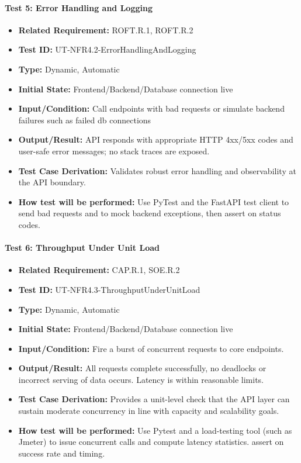 \documentclass[12pt, titlepage]{article}
\begin{document}
\begin{flushleft}
\paragraph{Test 5: Error Handling and Logging}
\begin{itemize}
    \item \textbf{Related Requirement:} ROFT.R.1, ROFT.R.2
    \item \textbf{Test ID:} UT-NFR4.2-ErrorHandlingAndLogging
    \item \textbf{Type:} Dynamic, Automatic
    \item \textbf{Initial State:} Frontend/Backend/Database connection live
    \item \textbf{Input/Condition:} Call endpoints with bad requests or simulate backend failures such as failed db connections
    \item \textbf{Output/Result:} API responds with appropriate HTTP 4xx/5xx codes and user-safe error messages; no stack traces are exposed.
    \item \textbf{Test Case Derivation:} Validates robust error handling and observability at the API boundary.
    \item \textbf{How test will be performed:} Use PyTest and the FastAPI test client to send bad requests and to mock backend exceptions, then assert on status codes.
\end{itemize}

\paragraph{Test 6: Throughput Under Unit Load}
\begin{itemize}
    \item \textbf{Related Requirement:} CAP.R.1, SOE.R.2
    \item \textbf{Test ID:} UT-NFR4.3-ThroughputUnderUnitLoad
    \item \textbf{Type:} Dynamic, Automatic
    \item \textbf{Initial State:} Frontend/Backend/Database connection live
    \item \textbf{Input/Condition:} Fire a burst of concurrent requests to core endpoints.
    \item \textbf{Output/Result:} All requests complete successfully, no deadlocks or incorrect serving of data occurs. Latency is within reasonable limits.
    \item \textbf{Test Case Derivation:} Provides a unit-level check that the API layer can sustain moderate concurrency in line with capacity and scalability goals.
    \item \textbf{How test will be performed:} Use Pytest and a load-testing tool (such as Jmeter) to issue concurrent calls and compute latency statistics. assert on success rate and timing.
\end{itemize}


\end{flushleft}
\end{document}

